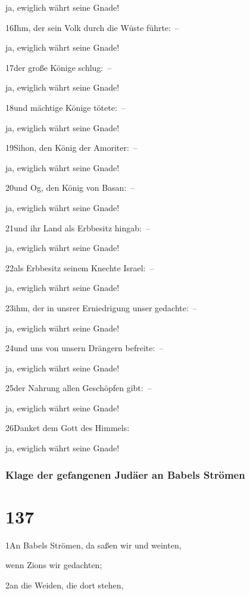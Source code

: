 ja, ewiglich währt seine Gnade!

16Ihm, der sein Volk durch die Wüste führte:~--

ja, ewiglich währt seine Gnade!

17der große Könige schlug:~--

ja, ewiglich währt seine Gnade!

18und mächtige Könige tötete:~--

ja, ewiglich währt seine Gnade!

19Sihon, den König der Amoriter:~--

ja, ewiglich währt seine Gnade!

20und Og, den König von Basan:~--

ja, ewiglich währt seine Gnade!

21und ihr Land als Erbbesitz hingab:~--

ja, ewiglich währt seine Gnade!

22als Erbbesitz seinem Knechte Israel:~--

ja, ewiglich währt seine Gnade!

23ihm, der in unsrer Erniedrigung unser gedachte:~--

ja, ewiglich währt seine Gnade!

24und uns von unsern Drängern befreite:~--

ja, ewiglich währt seine Gnade!

25der Nahrung allen Geschöpfen gibt:~--

ja, ewiglich währt seine Gnade!

26Danket dem Gott des Himmels:

ja, ewiglich währt seine Gnade!

\hypertarget{klage-der-gefangenen-juduxe4er-an-babels-struxf6men}{%
\subsubsection{Klage der gefangenen Judäer an Babels
Strömen}\label{klage-der-gefangenen-juduxe4er-an-babels-struxf6men}}

\hypertarget{section-136}{%
\section{137}\label{section-136}}

1An Babels Strömen, da saßen wir und weinten,

wenn Zions wir gedachten;

2an die Weiden, die dort stehen,

